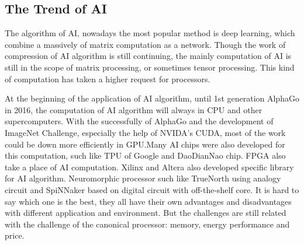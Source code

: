 \subsection{The Trend of AI}
\par The algorithm of AI, nowadays the most popular method is deep learning, which combine a massively of matrix computation as a network. Though the work of compression of AI algorithm is still continuing, the mainly computation of AI is still in the scope of matrix processing, or sometimes tensor processing. This kind of computation has taken a higher request for processors. 
\par 
At the beginning of the application of AI algorithm, until 1st generation AlphaGo\cite{silver2016mastering} in 2016, the computation of AI algorithm will always in CPU and other supercomputers. With the successfully of AlphaGo and the development of ImageNet Challenge\cite{dean2012large}, especially the help of NVIDA’s CUDA, most of the work could be down more efficiently in GPU\cite{ren2015faster}\cite{schmidhuber2015deep}.Many AI chips were also developed for this computation, such like TPU of Google\cite{jouppi2017datacenter}\cite{silver2017mastering} and DaoDianNao chip\cite{chen2014dadiannao}. FPGA also take a place of AI computation\cite{schmidhuber2015deep}\cite{zhang2015optimizing}. Xilinx and Altera also developed specific library for AI algorithm. Neuromorphic processor such like TrueNorth\cite{merolla2014million} using analogy circuit and SpiNNaker\cite{furber2014spinnaker} based on digital circuit with off-the-shelf core.
It is hard to say which one is the best, they all have their own advantages and disadvantages with different application and environment. But the challenges are still related with the challenge of the canonical processor: memory, energy performance and price.

